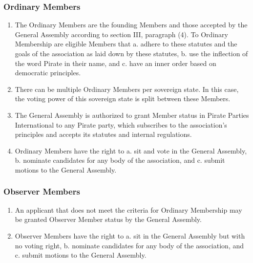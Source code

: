 \begin{frame}

\frametitle{Ordinary Members}
\label{ordinarymembers}

\begin{enumerate}
\item The Ordinary Members are the founding Members and those accepted by the General Assembly according to section III, paragraph (4). To Ordinary Membership are eligible Members that
 a. adhere to these statutes and the goals of the association as laid down by these statutes,
 b. use the inflection of the word Pirate in their name, and
 c. have an inner order based on democratic principles.

\item There can be multiple Ordinary Members per sovereign state. In this case, the voting power of this sovereign state is split between these Members.

\item The General Assembly is authorized to grant Member status in Pirate Parties International to any Pirate party, which subscribes to the association’s principles and accepts its statutes and internal regulations.

\item Ordinary Members have the right to
 a. sit and vote in the General Assembly,
 b. nominate candidates for any body of the association, and
 c. submit motions to the General Assembly.

\end{enumerate}

\end{frame}

\begin{frame}

\frametitle{Observer Members}
\label{observermembers}

\begin{enumerate}
\item An applicant that does not meet the criteria for Ordinary Membership may be granted Observer Member status by the General Assembly.

\item Observer Members have the right to
 a. sit in the General Assembly but with no voting right,
 b. nominate candidates for any body of the association, and
 c. submit motions to the General Assembly.

\end{enumerate}

\end{frame}

